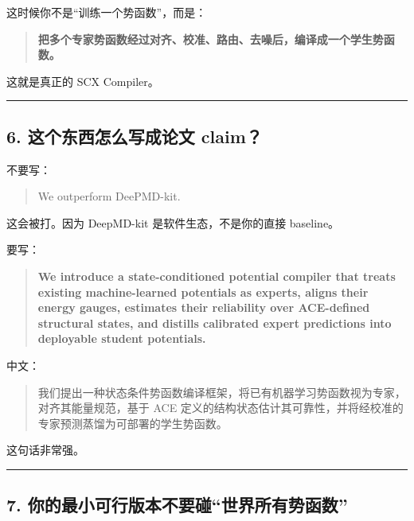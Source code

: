 \documentclass[
  12pt,
]{ctexart}
\begin{document}
这时候你不是``训练一个势函数''，而是：

\begin{quote}
\textbf{把多个专家势函数经过对齐、校准、路由、去噪后，编译成一个学生势函数。}
\end{quote}

这就是真正的 SCX Compiler。

\begin{center}\rule{0.5\linewidth}{0.5pt}\end{center}

\subsection{6. 这个东西怎么写成论文
claim？}\label{ux8fd9ux4e2aux4e1cux897fux600eux4e48ux5199ux6210ux8bbaux6587-claim}

不要写：

\begin{quote}
We outperform DeePMD-kit.
\end{quote}

这会被打。因为 DeepMD-kit 是软件生态，不是你的直接 baseline。

要写：

\begin{quote}
\textbf{We introduce a state-conditioned potential compiler that treats
existing machine-learned potentials as experts, aligns their energy
gauges, estimates their reliability over ACE-defined structural states,
and distills calibrated expert predictions into deployable student
potentials.}
\end{quote}

中文：

\begin{quote}
我们提出一种状态条件势函数编译框架，将已有机器学习势函数视为专家，对齐其能量规范，基于
ACE
定义的结构状态估计其可靠性，并将经校准的专家预测蒸馏为可部署的学生势函数。
\end{quote}

这句话非常强。

\begin{center}\rule{0.5\linewidth}{0.5pt}\end{center}

\subsection{7.
你的最小可行版本不要碰``世界所有势函数''}\label{ux4f60ux7684ux6700ux5c0fux53efux884cux7248ux672cux4e0dux8981ux78b0ux4e16ux754cux6240ux6709ux52bfux51fdux6570}
\end{document}
